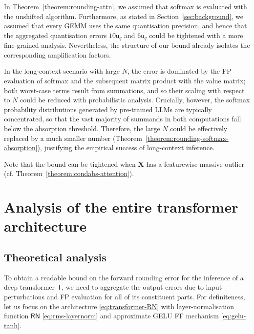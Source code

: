 \documentclass[namedate,webpdf,imanum]{ima-authoring-template}
\newcommand{\Matrix}[1]{\mathbf{#1}}
\newcommand{\Layer}[1]{\mathsf{#1}}
\newcommand{\uh}{\mathsf{u}}
\numberwithin{equation}{section}
\begin{document}
In Theorem~\ref{theorem:rounding-attn}, we assumed that softmax is evaluated with the unshifted algorithm.
Furthermore, as stated in Section~\ref{sec:background}, we assumed that every GEMM uses the same quantisation precision, and hence that the aggregated quantisation errors $10 \uh_{q}$ and $6 \uh_{q}$ could be tightened with a more fine-grained analysis.
Nevertheless, the structure of our bound already isolates the corresponding amplification factors.

In the long-context scenario with large $N$, the error is dominated by the FP evaluation of softmax and the subsequent matrix product with the value matrix; both worst-case terms result from summations, and so their scaling with respect to $N$ could be reduced with probabilistic analysis.
Crucially, however, the softmax probability distributions generated by pre-trained LLMs are typically concentrated, so that the vast majority of summands in both computations fall below the absorption threshold.
Therefore, the large $N$ could be effectively replaced by a much smaller number (Theorem~\ref{theorem:rounding-softmax-absorption}), justifying the empirical success of long-context inference.

Note that the bound can be tightened when $\Matrix{X}$ has a featurewise massive outlier (cf. Theorem~\ref{theorem:condabs-attention}).
\section{Analysis of the entire transformer architecture}
\label{sec:transformer}

\subsection{Theoretical analysis}
\label{subsec:transformer-theory}
To obtain a readable bound on the forward rounding error for the inference of a deep transformer $\Layer{T}$, we need to aggregate the output errors due to input perturbations and FP evaluation for all of its constituent parts.
For definiteness, let us focus on the architecture \eqref{eq:transformer-RN} with layer-normalisation function $\Layer{RN}$ \eqref{eq:rms-layernorm} and approximate GELU FF mechanism \eqref{eq:gelu-tanh}.
\end{document}

